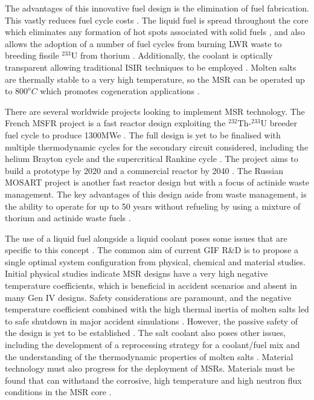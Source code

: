 \documentclass[journal]{IEEEtran}
\begin{document}
The advantages of this innovative fuel design is the elimination of fuel fabrication.
This vastly reduces fuel cycle costs \cite{Locatelli2013}.
The liquid fuel is spread throughout the core which eliminates any formation of hot spots associated with solid fuels \cite{Locatelli2013}, and also allows the adoption of a number of fuel cycles from burning LWR waste to breeding fissile $^{233}$U from thorium \cite{GenIVForum}.
Additionally, the coolant is optically transparent allowing traditional ISIR techniques to be employed \cite{Bhatnagar2011}.
Molten salts are thermally stable to a very high temperature, so the MSR can be operated up to $800^{o}C$ which promotes cogeneration applications \cite{Marques2010a}. 

There are several worldwide projects looking to implement MSR technology.
The French MSFR project is a fast reactor design exploiting the $^{232}$Th-$^{233}$U breeder fuel cycle \cite{GenIVForum} to produce 1300MWe \cite{Locatelli2013}.
The full design is yet to be finalised with multiple thermodynamic cycles for the secondary circuit considered, including the helium Brayton cycle and the supercritical Rankine cycle \cite{Locatelli2013}.
The project aims to build a prototype by 2020 and a commercial reactor by 2040 \cite{Locatelli2013}.
The Russian MOSART project is another fast reactor design but with a focus of actinide waste management. 
The key advantages of this design aside from waste management, is the ability to operate for up to 50 years without refueling by using a mixture of thorium and actinide waste fuels \cite{GenIVForum}.

The use of a liquid fuel alongside a liquid coolant poses some issues that are specific to this concept \cite{Sakamoto2013194}.
The common aim of current GIF R\&D is to propose a single optimal system configuration from physical, chemical and material studies.
Initial physical studies indicate MSR designs have a very high negative temperature coefficients, which is beneficial in accident scenarios and absent in many Gen IV designs.
Safety considerations are paramount, and the negative temperature coefficient combined with the high thermal inertia of molten salts led to safe shutdown in major accident simulations \cite{GenIVForum}.
However, the passive safety of the design is yet to be established \cite{Locatelli2013}.
The salt coolant also poses other issues, including the development of a reprocessing strategy for a coolant/fuel mix and the understanding of the thermodynamic properties of molten salts \cite{GenIVForum}.
Material technology must also progress for the deployment of MSRs. Materials must be found that can withstand the corrosive, high temperature and high neutron flux conditions in the MSR core \cite{GenIVForum}.
\end{document}
